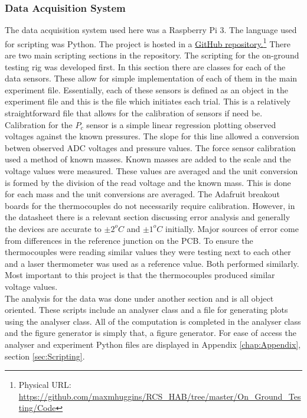 \subsubsection{Data Acquisition System}
The data acquisition system used here was a Raspberry Pi 3. The language used for scripting was Python. The project is hosted in a \href{https://github.com/maxmhuggins/RCS_HAB/tree/master/On_Ground_Testing/Code}{GitHub repository.}\footnote{Physical URL: \url{https://github.com/maxmhuggins/RCS_HAB/tree/master/On_Ground_Testing/Code}} There are two main scripting sections in the repository. The scripting for the on-ground testing rig was developed first. In this section there are classes for each of the data sensors. These allow for simple implementation of each of them in the main experiment file. Essentially, each of these sensors is defined as an object in the experiment file and this is the file which initiates each trial. This is a relatively straightforward file that allows for the calibration of sensors if need be. Calibration for the $P_c$ sensor is a simple linear regression plotting observed voltages against the known pressures. The slope for this line allowed a conversion betwen observed ADC voltages and pressure values. The force sensor calibration used a method of known masses. Known masses are added to the scale and the voltage values were measured. These values are averaged and the unit conversion is formed by the division of the read voltage and the known mass. This is done for each mass and the unit conversions are averaged. The Adafruit breakout boards for the thermocouples do not necessarily require calibration. However, in the datasheet \cite{thermocouple} there is a relevant section discussing error analysis and generally the devices are accurate to $\pm 2^oC$ and $\pm 1^oC$ initially. Major sources of error come from differences in the reference junction on the PCB. To ensure the thermocouples were reading similar values they were testing next to each other and a laser thermometer was used as a reference value. Both performed similarly. Most important to this project is that the thermocouples produced similar voltage values.\\
The analysis for the data was done under another section and is all object oriented. These scripts include an analyser class and a file for generating plots using the analyser class. All of the computation is completed in the analyser class and the figure generator is simply that, a figure generator. For ease of access the analyser and experiment Python files are displayed in Appendix \ref{chap:Appendix}, section \ref{sec:Scripting}.

